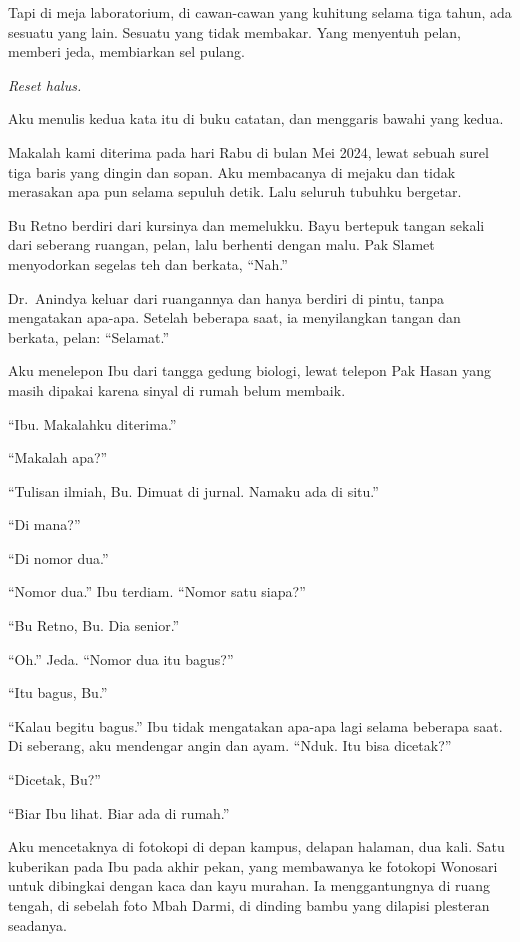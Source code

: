 \documentclass[11pt,twoside,openany]{book}
\makeatletter
\newcommand{\scenebreak}{\par\vspace{0.9em}{\centering\textsc{*\hspace{0.7em}*\hspace{0.7em}*}\par}\vspace{0.9em}\@afterindentfalse\@afterheading}
\makeatother
\begin{document}
Tapi di meja laboratorium, di cawan-cawan yang kuhitung selama tiga tahun, ada sesuatu yang lain. Sesuatu yang tidak membakar. Yang menyentuh pelan, memberi jeda, membiarkan sel pulang.

\emph{Reset halus.}

Aku menulis kedua kata itu di buku catatan, dan menggaris bawahi yang kedua.

\scenebreak
Makalah kami diterima pada hari Rabu di bulan Mei 2024, lewat sebuah surel tiga baris yang dingin dan sopan. Aku membacanya di mejaku dan tidak merasakan apa pun selama sepuluh detik. Lalu seluruh tubuhku bergetar.

Bu Retno berdiri dari kursinya dan memelukku. Bayu bertepuk tangan sekali dari seberang ruangan, pelan, lalu berhenti dengan malu. Pak Slamet menyodorkan segelas teh dan berkata, ``Nah.''

Dr.~Anindya keluar dari ruangannya dan hanya berdiri di pintu, tanpa mengatakan apa-apa. Setelah beberapa saat, ia menyilangkan tangan dan berkata, pelan: ``Selamat.''

Aku menelepon Ibu dari tangga gedung biologi, lewat telepon Pak Hasan yang masih dipakai karena sinyal di rumah belum membaik.

``Ibu. Makalahku diterima.''

``Makalah apa?''

``Tulisan ilmiah, Bu. Dimuat di jurnal. Namaku ada di situ.''

``Di mana?''

``Di nomor dua.''

``Nomor dua.'' Ibu terdiam. ``Nomor satu siapa?''

``Bu Retno, Bu. Dia senior.''

``Oh.'' Jeda. ``Nomor dua itu bagus?''

``Itu bagus, Bu.''

``Kalau begitu bagus.'' Ibu tidak mengatakan apa-apa lagi selama beberapa saat. Di seberang, aku mendengar angin dan ayam. ``Nduk. Itu bisa dicetak?''

``Dicetak, Bu?''

``Biar Ibu lihat. Biar ada di rumah.''

Aku mencetaknya di fotokopi di depan kampus, delapan halaman, dua kali. Satu kuberikan pada Ibu pada akhir pekan, yang membawanya ke fotokopi Wonosari untuk dibingkai dengan kaca dan kayu murahan. Ia menggantungnya di ruang tengah, di sebelah foto Mbah Darmi, di dinding bambu yang dilapisi plesteran seadanya.
\end{document}

